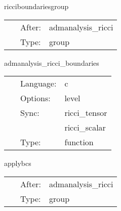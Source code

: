 \vspace{5mm}


\hspace{5mm} ricciboundariesgroup 

\hspace{5mm}{\it set ricci tensor on the boundary } 


\hspace{5mm}

 \begin{tabular*}{160mm}{cll} 
~ & After:  & admanalysis\_ricci \\ 
~ & Type:  & group \\ 
\end{tabular*} 


\vspace{5mm}


\hspace{5mm} admanalysis\_ricci\_boundaries 

\hspace{5mm}{\it select boundary conditions for the ricci tensor } 


\hspace{5mm}

 \begin{tabular*}{160mm}{cll} 
~ & Language:  & c \\ 
~ & Options:  & level \\ 
~ & Sync:  & ricci\_tensor \\ 
~& ~ &ricci\_scalar\\ 
~ & Type:  & function \\ 
\end{tabular*} 


\vspace{5mm}


\hspace{5mm} applybcs 

\hspace{5mm}{\it apply boundary conditions to the ricci tensor } 


\hspace{5mm}

 \begin{tabular*}{160mm}{cll} 
~ & After:  & admanalysis\_ricci \\ 
~ & Type:  & group \\ 
\end{tabular*} 


